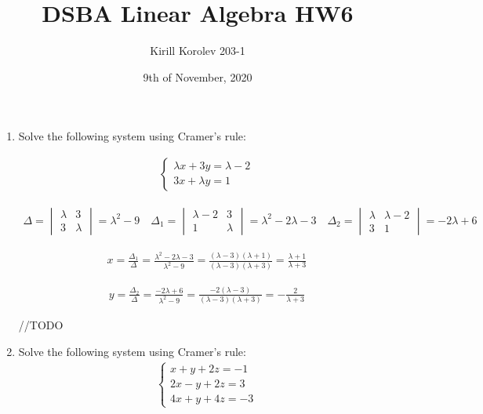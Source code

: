 \documentclass{article}
\title{DSBA Linear Algebra HW6}
\author{Kirill Korolev 203-1}
\date{9th of November, 2020}
\begin{document}
\maketitle

\begin{enumerate}

\item Solve the following system using Cramer’s rule:

\begin{align*}
\begin{cases}
\lambda x + 3y=\lambda - 2\\
3x+\lambda y=1
\end{cases}
\end{align*}

\begin{align*}
\Delta = \begin{vmatrix}
\lambda & 3\\
3 & \lambda
\end{vmatrix}=\lambda^2-9 \quad
\Delta_1 = \begin{vmatrix}
\lambda - 2 & 3\\
1 & \lambda
\end{vmatrix}=\lambda^2-2\lambda-3 \quad
\Delta_2 = \begin{vmatrix}
\lambda & \lambda-2\\
3 & 1
\end{vmatrix}=-2\lambda+6
\end{align*}

\begin{align*}
x = \frac{\Delta_1}{\Delta} = \frac{\lambda^2-2\lambda-3}{\lambda^2-9}=\frac{(\lambda-3)(\lambda+1)}{(\lambda-3)(\lambda+3)}=\frac{\lambda+1}{\lambda+3}
\end{align*}

\begin{align*}
y = \frac{\Delta_2}{\Delta} = \frac{-2\lambda+6}{\lambda^2-9}=\frac{-2(\lambda-3)}{(\lambda-3)(\lambda+3)}=-\frac{2}{\lambda+3}
\end{align*}

//TODO

\newpage
\item Solve the following system using Cramer’s rule:
\begin{align*}
\begin{cases}
x+y+2z=-1\\
2x-y+2z=3\\
4x+y+4z=-3
\end{cases}
\end{align*}


\end{enumerate}
\end{document}
